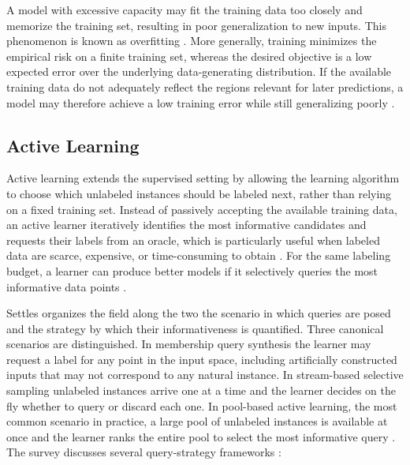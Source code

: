 \documentclass[12pt,a4paper]{report}
\begin{document}
        A model with excessive capacity may fit the training data too closely and memorize the training set, resulting in poor generalization to new inputs. This phenomenon is known as overfitting \cite{Goodfellow-et-al-2016}. More generally, training minimizes the empirical risk on a finite training set, whereas the desired objective is a low expected error over the underlying data-generating distribution. If the available training data do not adequately reflect the regions relevant for later predictions, a model may therefore achieve a low training error while still generalizing poorly \cite{Goodfellow-et-al-2016}.

        \subsection{Active Learning}
        Active learning extends the supervised setting by allowing the learning algorithm to choose which unlabeled instances should be labeled next, rather than relying on a fixed training set. Instead of passively accepting the available training data, an active learner iteratively identifies the most informative candidates and requests their labels from an oracle, which is particularly useful when labeled data are scarce, expensive, or time-consuming to obtain \cite{settles2009active}. For the same labeling budget, a learner can produce better models if it selectively queries the most informative data points \cite{settles2009active}.

        Settles \cite{settles2009active} organizes the field along the two the scenario in which queries are posed and the strategy by which their informativeness is quantified. Three canonical scenarios are distinguished. In membership query synthesis the learner may request a label for any point in the input space, including artificially constructed inputs that may not correspond to any natural instance. In stream-based selective sampling unlabeled instances arrive one at a time and the learner decides on the fly whether to query or discard each one. In pool-based active learning, the most common scenario in practice, a large pool of unlabeled instances is available at once and the learner ranks the entire pool to select the most informative query \cite{settles2009active}. The survey discusses several query-strategy frameworks \cite{settles2009active}:
\end{document}
